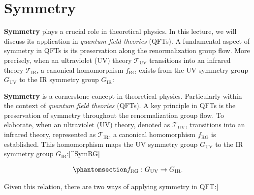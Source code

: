 \documentclass[
  letterpaper,
  DIV=11,
  numbers=noendperiod]{scrreport}
\begin{document}
\section{Symmetry}\label{symmetry}

\textbf{Symmetry} plays a crucial role in theoretical physics. In this
lecture, we will discuss its application in \emph{quantum field
theories} (QFTs). A fundamental aspect of symmetry in QFTs is its
preservation along the renormalization group flow. More precisely, when
an ultraviolet (UV) theory \(\mathcal{T}_\text{UV}\) transitions into an
infrared theory \(\mathcal{T}_\text{IR}\), a canonical homomorphism
\(f_\text{RG}\) exists from the UV symmetry group \(G_\text{UV}\) to the
IR symmetry group \(G_\text{IR}\):

\textbf{Symmetry} is a cornerstone concept in theoretical physics.
Particularly within the context of \emph{quantum field theories} (QFTs).
A key principle in QFTs is the preservation of symmetry throughout the
renormalization group flow. To elaborate, when an ultraviolet (UV)
theory, denoted as \(\mathcal{T}_\text{UV}\), transitions into an
infrared theory, represented as \(\mathcal{T}_\text{IR}\), a canonical
homomorphism \(f_\text{RG}\) is established. This homomorphism maps the
UV symmetry group \(G_\text{UV}\) to the IR symmetry group
\(G_\text{IR}\):{[}\^{}SymRG{]}

\begin{tcolorbox}[enhanced jigsaw, arc=.35mm, bottomrule=.15mm, toprule=.15mm, title=\textcolor{quarto-callout-important-color}{\faExclamation}\hspace{0.5em}{RG flow homomorphism from UV symmetry to IR symmetry}, colback=white, opacitybacktitle=0.6, rightrule=.15mm, opacityback=0, breakable, bottomtitle=1mm, titlerule=0mm, leftrule=.75mm, coltitle=black, colframe=quarto-callout-important-color-frame, toptitle=1mm, left=2mm, colbacktitle=quarto-callout-important-color!10!white]

\begin{equation}\phantomsection\label{eq-RG-group-match}{
f_\text{RG} : G_\text{UV} \to G_\text{IR}.
}\end{equation}

\end{tcolorbox}

Given this relation, there are two ways of applying symmetry in QFT:{]}
\end{document}

